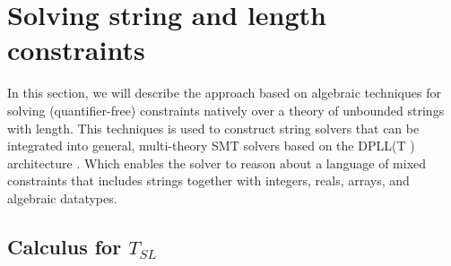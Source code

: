 \section{Solving string and length constraints}
\label{sec:Solving string and length constraints}

In this section, we will describe the approach based on algebraic techniques for solving (quantifier-free) constraints natively over a theory of unbounded strings with length. This techniques is used to construct string solvers that can be integrated into general, multi-theory SMT solvers based on the DPLL(T ) architecture \cite{dpll_t}. Which enables the solver to reason about a language of mixed constraints that includes strings together with integers, reals, arrays, and algebraic datatypes. 

\subsection{Calculus for \(T_{SL}\)}
